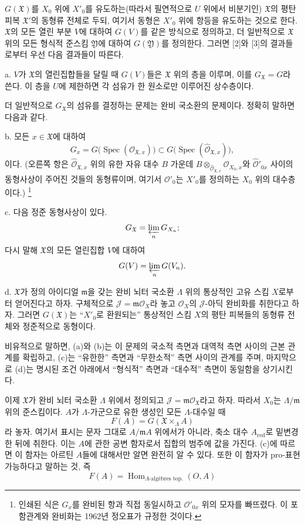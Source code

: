 $G(\mathfrak X)$를 $X_0$ 위에 $X'_0$를 유도하는(따라서 필연적으로
$U$ 위에서 비분기인) $\mathfrak X$의 평탄 피복 $\mathfrak X'$의 동형류
전체로 두되, 여기서 동형은 $X'_0$ 위에 항등을 유도하는 것으로 한다.
$\mathfrak X$의 모든 열린 부분 $V$에 대하여 $G(V)$를 같은 방식으로
정의하고, 더 일반적으로 $\mathfrak X$ 위의 모든 형식적 준스킴
$\mathfrak Y$에 대하여 $G(\mathfrak Y)$를 정의한다. 그러면 [2]와 [3]의
결과들로부터 우선 다음 결과들이 따른다.

\noindent a. $V$가 $\mathfrak X$의 열린집합들을 달릴 때 $G(V)$들은
$\mathfrak X$ 위의 층을 이루며, 이를 $G_{\mathfrak X}=G$라 쓴다. 이 층을
$U$에 제한하면 각 섬유가 한 원소로만 이루어진 상수층이다.

더 일반적으로 $G_{\mathfrak X}$의 섬유를 결정하는 문제는 완비 국소환의
문제이다. 정확히 말하면 다음과 같다.

\noindent b. 모든 $x\in\mathfrak X$에 대하여
\[
  G_x=G\bigl(\operatorname{Spec}(\mathcal O_{\mathfrak X,x})\bigr)
  \subset
  G\bigl(\operatorname{Spec}(\widehat{\mathcal O}_{\mathfrak X,x})\bigr),
\]
이다. (오른쪽 항은 $\widehat{\mathcal O}_{\mathfrak X,x}$ 위의 유한 자유
대수 $B$ 가운데
$B\otimes_{\widehat{\mathcal O}_{\mathfrak X,x}}\mathcal O_{X_0,x}$와
$\widehat{\mathcal O}'_{0x}$ 사이의 동형사상이 주어진 것들의 동형류이며,
여기서 $\mathcal O'_0$는 $X'_0$를 정의하는 $X_0$ 위의 대수층이다.)
\footnote{인쇄된 식은 $G_x$를 완비된 항과 직접 동일시하고
$\mathcal O'_{0x}$ 위의 모자를 빠뜨렸다. 이 포함관계와 완비화는 1962년
정오표가 규정한 것이다.}

\noindent c. 다음 정준 동형사상이 있다.
\[
  G_{\mathfrak X}=\varprojlim_nG_{X_n} ;
\]
다시 말해 $\mathfrak X$의 모든 열린집합 $V$에 대하여
\[
  G(V)=\varprojlim_nG(V_n).
\]

\noindent d. $\mathfrak X$가 정의 아이디얼 $\mathfrak m$을 갖는 완비
뇌터 국소환 $\Lambda$ 위의 통상적인 고유 스킴 $X$로부터 얻어진다고 하자.
구체적으로 $\mathcal J=\mathfrak m\mathcal O_X$라 놓고
$\mathcal O_X$의 $\mathcal J$-아딕 완비화를 취한다고 하자. 그러면
$G(\mathfrak X)$는 ``$X'_0$로 환원되는'' 통상적인 스킴 $X$의 평탄
피복들의 동형류 전체와 정준적으로 동형이다.

비유적으로 말하면, (a)와 (b)는 이 문제의 국소적 측면과 대역적 측면 사이의
근본 관계를 확립하고, (c)는 ``유한한'' 측면과 ``무한소적'' 측면 사이의
관계를 주며, 마지막으로 (d)는 명시된 조건 아래에서 ``형식적'' 측면과
``대수적'' 측면이 동일함을 상기시킨다.

이제 $\mathfrak X$가 완비 뇌터 국소환 $\Lambda$ 위에서 정의되고
$\mathcal J=\mathfrak m\mathcal O_{\mathfrak X}$라고 하자. 따라서 $X_0$는
$\Lambda/\mathfrak m$ 위의 준스킴이다. $A$가 $\Lambda$-가군으로 유한
생성인 모든 $\Lambda$-대수일 때
\[
  F(A)=G(\mathfrak X\times_\Lambda A)
\]
라 놓자. 여기서 표시는 문자 그대로 $A/\mathfrak mA$ 위에서가 아니라,
축소 대수 $A_{\mathrm{red}}$로 밑변경한 뒤에 취한다. 이는 $A$에 관한
공변 함자로서 집합의 범주에 값을 가진다. (c)에 따르면 이 함자는 아르틴
$A$들에 대해서만 알면 완전히 알 수 있다. 또한 이 함자가 pro-표현 가능하다고
말하는 것, 즉
\[
  F(A)=\operatorname{Hom}_{\Lambda\text{-algèbres top.}}(O,A)
\]

